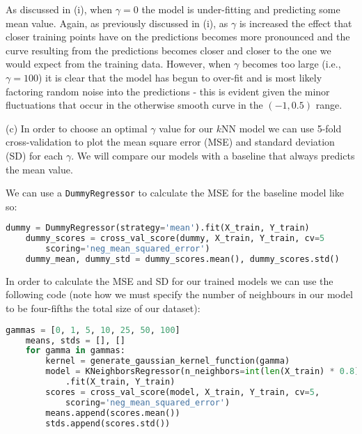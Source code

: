 \documentclass[12pt]{article}
\begin{document}
As discussed in (i), when $\gamma = 0$ the model is under-fitting and predicting some mean value. Again, as previously discussed in (i), as $\gamma$ is increased the effect that closer training points have on the predictions becomes more pronounced and the curve resulting from the predictions becomes closer and closer to the one we would expect from the training data. However, when $\gamma$ becomes too large (i.e., $\gamma = 100$) it is clear that the model has begun to over-fit and is most likely factoring random noise into the predictions - this is evident given the minor fluctuations that occur in the otherwise smooth curve in the $(-1, 0.5)$ range.

\noindent (c) In order to choose an optimal $\gamma$ value for our $k$NN model we can use 5-fold cross-validation to plot the mean square error (MSE) and standard deviation (SD) for each $\gamma$. We will compare our models with a baseline that always predicts the mean value.

We can use a \texttt{DummyRegressor} to calculate the MSE for the baseline model like so:

\begin{center}
    \lstset{basicstyle=\footnotesize}
    \begin{lstlisting}[language=Python]
    dummy = DummyRegressor(strategy='mean').fit(X_train, Y_train)
    dummy_scores = cross_val_score(dummy, X_train, Y_train, cv=5
        scoring='neg_mean_squared_error')
    dummy_mean, dummy_std = dummy_scores.mean(), dummy_scores.std()
    \end{lstlisting}
\end{center}

In order to calculate the MSE and SD for our trained models we can use the following code (note how we must specify the number of neighbours in our model to be four-fifths the total size of our dataset):

\begin{center}
    \lstset{basicstyle=\footnotesize}
    \begin{lstlisting}[language=Python]
    gammas = [0, 1, 5, 10, 25, 50, 100]
    means, stds = [], []
    for gamma in gammas:
        kernel = generate_gaussian_kernel_function(gamma)
        model = KNeighborsRegressor(n_neighbors=int(len(X_train) * 0.8), weights=kernel)
            .fit(X_train, Y_train)
        scores = cross_val_score(model, X_train, Y_train, cv=5,
            scoring='neg_mean_squared_error')
        means.append(scores.mean())
        stds.append(scores.std())
    \end{lstlisting}
\end{center}
\end{document}
